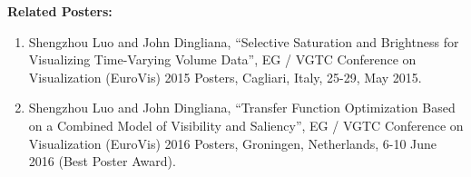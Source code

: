 \documentclass[a4paper, 12pt, twoside, openright]{report}         %
\begin{document}
\textbf{Related Posters:}
\begin{enumerate}
	\item Shengzhou Luo and John Dingliana, ``Selective Saturation and Brightness for Visualizing Time-Varying Volume Data'', EG / VGTC Conference on Visualization (EuroVis) 2015 Posters, Cagliari, Italy, 25-29, May 2015.
	\item Shengzhou Luo and John Dingliana, ``Transfer Function Optimization Based on a Combined Model of Visibility and Saliency'', EG / VGTC Conference on Visualization (EuroVis) 2016 Posters, Groningen, Netherlands, 6-10 June 2016 (Best Poster Award).
\end{enumerate}
                           
\cleardoublepage



\cleardoublepage
                             


\cleardoublepage



\cleardoublepage



\cleardoublepage



\cleardoublepage



\cleardoublepage

\begin{appendix}


\end{appendix}

\cleardoublepage





\end{document}
